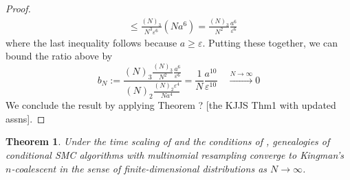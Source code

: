 \documentclass[fleqn]{article}
\newtheorem{thm}{Theorem}
\theoremstyle{definition}
\newcommand{\Ntoinfty}{\overset{N\to\infty}{\longrightarrow}}
\begin{document}
\begin{proof}
\begin{align*}
&\leq \frac{(N)_3}{N^3\varepsilon^6} (Na^6) = \frac{(N)_3}{N^2} \frac{a^6}{\varepsilon^6}
\end{align*}
where the last inequality follows because $a\geq \varepsilon$.
Putting these together, we can bound the ratio above by
\begin{equation}
b_N := \frac{(N)_3 \frac{(N)_3}{N^2} \frac{a^6}{\varepsilon^6}}{(N)_2 \frac{(N)_2 \varepsilon^4}{Na^4}} = \frac{1}{N}\frac{a^{10}}{\varepsilon^{10}} \quad \Ntoinfty 0
\end{equation}
We conclude the result by applying Theorem ? [the KJJS Thm1 with updated assns].
\end{proof}

\begin{thm}\label{thm:CSMC_newassns}
Under the time scaling of \citet[Theorem 1]{koskela2018} and the conditions of \citet[Lemma 3]{koskela2018}, genealogies of conditional SMC algorithms with multinomial resampling converge to Kingman's $n$-coalescent in the sense of finite-dimensional distributions as $N\to\infty$.
\end{thm}
\end{document}
